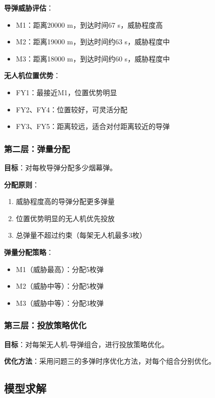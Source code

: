 \documentclass[12pt,a4paper]{article}
\begin{document}
\textbf{导弹威胁评估}：
\begin{itemize}
    \item M1：距离20000 m，到达时间67 s，威胁程度高
    \item M2：距离19000 m，到达时间约63 s，威胁程度中
    \item M3：距离18000 m，到达时间约60 s，威胁程度中
\end{itemize}

\textbf{无人机位置优势}：
\begin{itemize}
    \item FY1：最接近M1，位置优势明显
    \item FY2、FY4：位置较好，可灵活分配
    \item FY3、FY5：距离较远，适合对付距离较近的导弹
\end{itemize}

\subsubsection{第二层：弹量分配}

\textbf{目标}：对每枚导弹分配多少烟幕弹。

\textbf{分配原则}：
\begin{enumerate}
    \item 威胁程度高的导弹分配更多弹量
    \item 位置优势明显的无人机优先投放
    \item 总弹量不超过约束（每架无人机最多3枚）
\end{enumerate}

\textbf{弹量分配策略}：
\begin{itemize}
    \item M1（威胁最高）：分配5枚弹
    \item M2（威胁中等）：分配5枚弹
    \item M3（威胁中等）：分配3枚弹
\end{itemize}

\subsubsection{第三层：投放策略优化}

\textbf{目标}：对每架无人机-导弹组合，进行投放策略优化。

\textbf{优化方法}：采用问题三的多弹时序优化方法，对每个组合分别优化。

\subsection{模型求解}
\end{document}
